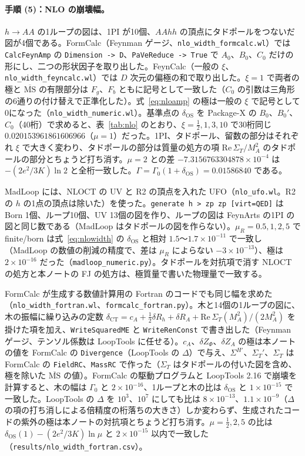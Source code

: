 \documentclass[a4paper,10pt]{ltjsarticle}
\newcommand{\MSbar}{\overline{\mathrm{MS}}}
\newcommand{\re}{\mathrm{Re}\,}
\begin{document}
\paragraph{手順 (5)：NLO の崩壊幅。}$h\to AA$ の1ループの図は、1PI が10個、$AAhh$ の頂点にタドポールをつないだ図が4個である。FormCalc（Feynman ゲージ、\texttt{nlo\_width\_formcalc.wl}）では \texttt{CalcFeynAmp} の \texttt{Dimension -> D}、\texttt{PaVeReduce -> True} で $A_0$、$B_0$、$C_0$ だけの形にし、二つの形状因子を取り出した。FeynCalc（一般の $\xi$、\texttt{nlo\_width\_feyncalc.wl}）では $D$ 次元の偏極の和で取り出した。$\xi=1$ で両者の極と $\MSbar$ の有限部分は $F_g$、$F_b$ ともに記号として一致した（$C_0$ の引数は三角形の6通りの付け替えで正準化した）。式~\eqref{eq:nloamp} の極は一般の $\xi$ で記号として0になった（\texttt{nlo\_width\_numeric.wl}）。基準点の $\delta_{\mathrm{OS}}$ を Package-X の $B_0$、$B_0'$、$C_0$（40桁）で求めると、表~\ref{tab:nlo} のとおり、$\xi=\frac12,1,3,10$ で30桁同じ $0.020153961861606966$（$\mu=1$）だった。1PI、タドポール、留数の部分はそれぞれ $\xi$ で大きく変わり、タドポールの部分は質量の処方の項 $\re\Sigma_T/M_A^2$ のタドポールの部分とちょうど打ち消す。$\mu=2$ との差 $-7.3156763304878\times10^{-4}$ は $-(2e^2/3K)\ln2$ と全桁一致した。$\Gamma=\Gamma_0(1+\delta_{\mathrm{OS}})=0.01586840$ である。

MadLoop には、NLOCT の UV と R2 の頂点を入れた UFO（\texttt{nlo\_ufo.wl}。R2 の $h$ の1点の頂点は除いた）を使った。\texttt{generate h > zp zp [virt=QED]} は Born 1個、ループ10個、UV 13個の図を作り、ループの図は FeynArts の1PI の図と同じ数である（MadLoop はタドポールの図を作らない）。$\mu_R=0.5,1,2,5$ で finite/born は式~\eqref{eq:nlowidth} の $\delta_{\mathrm{OS}}$ と相対 $1.5$〜$1.7\times10^{-11}$ で一致し（MadLoop の数値の削減の精度で、差は $\mu_R$ によらない $-3\times10^{-13}$）、極は $2\times10^{-16}$ だった（\texttt{madloop\_numeric.py}）。タドポールを対抗項で消す NLOCT の処方と本ノートの FJ の処方は、極質量で書いた物理量で一致する。

FormCalc が生成する数値計算用の Fortran のコードでも同じ幅を求めた（\texttt{nlo\_width\_fortran.wl}、\texttt{formcalc\_fortran.py}）。木と14個の1ループの図に、木の振幅に繰り込みの定数 $\delta_{\mathrm{CT}}=c_A+\frac12\delta R_h+\delta R_A+\re\Sigma_T(M_A^2)/(2M_A^2)$ を掛けた項を加え、\texttt{WriteSquaredME} と \texttt{WriteRenConst} で書き出した（Feynman ゲージ、テンソル係数は LoopTools に任せる）。$c_A$、$\delta Z_\Phi$、$\delta Z_A$ の極は本ノートの値を FormCalc の \texttt{Divergence}（LoopTools の $\Delta$）で与え、$\Sigma^{H\prime}$、$\Sigma_T'$、$\Sigma_T$ は FormCalc の \texttt{FieldRC}、\texttt{MassRC} で作った（$\Sigma_T$ はタドポールの付いた図を含め、極を除いた $\MSbar$ の値）。FormCalc の駆動プログラムと LoopTools 2.16 で崩壊を計算すると、木の幅は $\Gamma_0$ と $2\times10^{-16}$、1ループと木の比は $\delta_{\mathrm{OS}}$ と $1\times10^{-15}$ で一致した。LoopTools の $\Delta$ を $10^3$、$10^7$ にしても比は $8\times10^{-13}$、$1.1\times10^{-9}$（$\Delta$ の項の打ち消しによる倍精度の桁落ちの大きさ）しか変わらず、生成されたコードの紫外の極は本ノートの対抗項とちょうど打ち消す。$\mu=\frac12,2,5$ の比は $\delta_{\mathrm{OS}}(1)-(2e^2/3K)\ln\mu$ と $2\times10^{-15}$ 以内で一致した（\texttt{results/nlo\_width\_fortran.csv}）。
\end{document}
